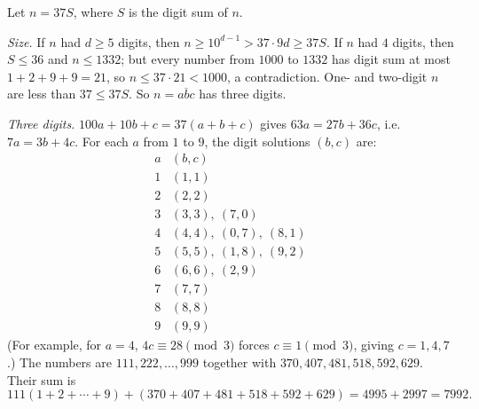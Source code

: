 Let $n=37S$, where $S$ is the digit sum of $n$.

\emph{Size.} If $n$ had $d\ge5$ digits, then $n\ge10^{d-1}>37\cdot9d\ge37S$. If $n$ had $4$ digits, then $S\le36$ and $n\le1332$; but every number from $1000$ to $1332$ has digit sum at most $1+2+9+9=21$, so $n\le37\cdot21<1000$, a contradiction. One- and two-digit $n$ are less than $37\le37S$. So $n=\overline{abc}$ has three digits.

\emph{Three digits.} $100a+10b+c=37(a+b+c)$ gives $63a=27b+36c$, i.e. $7a=3b+4c$. For each $a$ from $1$ to $9$, the digit solutions $(b,c)$ are:
\[\begin{array}{c|l}
a&(b,c)\\\hline
1&(1,1)\\
2&(2,2)\\
3&(3,3),\ (7,0)\\
4&(4,4),\ (0,7),\ (8,1)\\
5&(5,5),\ (1,8),\ (9,2)\\
6&(6,6),\ (2,9)\\
7&(7,7)\\
8&(8,8)\\
9&(9,9)
\end{array}\]
(For example, for $a=4$, $4c\equiv28\pmod3$ forces $c\equiv1\pmod3$, giving $c=1,4,7$.) The numbers are $111,222,\dots,999$ together with $370,407,481,518,592,629$. Their sum is
\[111(1+2+\cdots+9)+(370+407+481+518+592+629)=4995+2997=\boxed{7992}.\]
